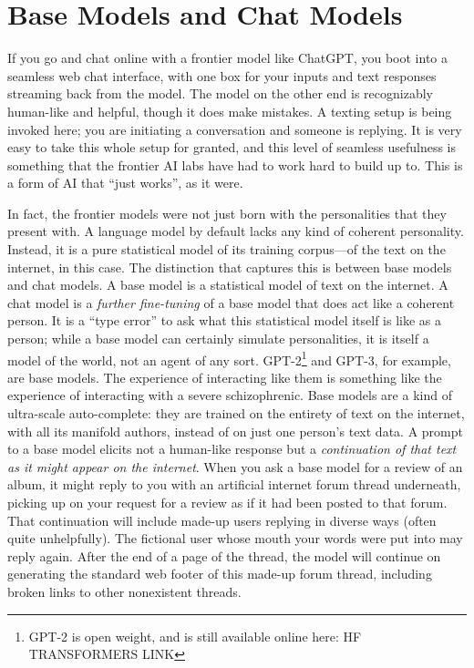 \section{Base Models and Chat Models}
If you go and chat online with a frontier model like ChatGPT, you boot into a
seamless web chat interface, with one box for your inputs and text responses
streaming back from the model. The model on the other end is recognizably
human-like and helpful, though it does make mistakes. A texting setup is being
invoked here; you are initiating a conversation and someone is replying. It is
very easy to take this whole setup for granted, and this level of seamless
usefulness is something that the frontier AI labs have had to work hard to
build up to. This is a form of AI that ``just works'', as it were.

In fact, the frontier models were not just born with the personalities that
they present with. A language model by default lacks any kind of coherent
personality. Instead, it is a pure statistical model of its training
corpus---of the text on the internet, in this case. The distinction that
captures this is between base models and chat models. A base model is a
statistical model of text on the internet. A chat model is a \emph{further
fine-tuning} of a base model that does act like a coherent person. It is a
``type error'' to ask what this statistical model itself is like as a person;
while a base model can certainly simulate personalities, it is itself a model
of the world, not an agent of any sort. GPT-2\footnote{GPT-2 is open weight,
and is still available online here: HF TRANSFORMERS LINK} and GPT-3, for
example, are base models. The experience of interacting like them is something
like the experience of interacting with a severe schizophrenic. Base models are
a kind of ultra-scale auto-complete: they are trained on the entirety of text
on the internet, with all its manifold authors, instead of on just one person's
text data. A prompt to a base model elicits not a human-like response but a
\emph{continuation of that text as it might appear on the internet}. When you
ask a base model for a review of an album, it might reply to you with an
artificial internet forum thread underneath, picking up on your request for a
review as if it had been posted to that forum. That continuation will include
made-up users replying in diverse ways (often quite unhelpfully). The fictional
user whose mouth your words were put into may reply again. After the end of a
page of the thread, the model will continue on generating the standard web
footer of this made-up forum thread, including broken links to other
nonexistent threads.

